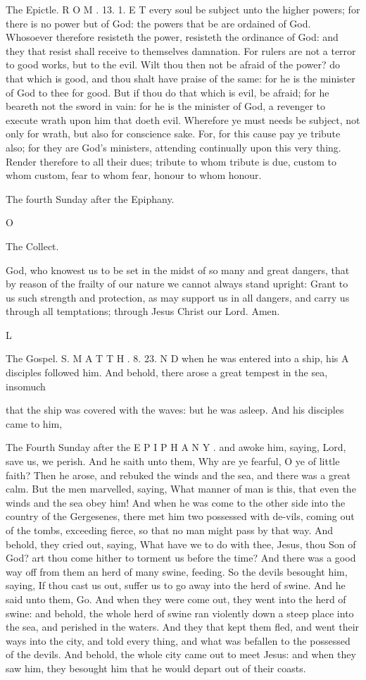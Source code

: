 The Epictle. R O M . 13. 1. E T every soul be subject unto the higher powers; for there is no power but of God: the powers that be are ordained of God. Whosoever therefore resisteth the power, resisteth the ordinance of God: and they that resist shall receive to themselves damnation. For rulers are not a terror to good works, but to the evil. Wilt thou then not be afraid of the power? do that which is good, and thou shalt have praise of the same: for he is the minister of God to thee for good. But if thou do that which is evil, be afraid; for he beareth not the sword in vain: for he is the minister of God, a revenger to execute wrath upon him that doeth evil. Wherefore ye must needs be subject, not only for wrath, but also for conscience sake. For, for this cause pay ye tribute also; for they are God's ministers, attending continually upon this very thing. Render therefore to all their dues; tribute to whom tribute is due, custom to whom custom, fear to whom fear, honour to whom honour.

The fourth Sunday after the Epiphany.

O

The Collect.

God, who knowest us to be set in the midst of so many and great dangers, that by reason of the frailty of our nature we cannot always stand upright: Grant to us such strength and protection, as may support us in all dangers, and carry us through all temptations; through Jesus Christ our Lord. Amen.

L

The Gospel. S. M A T T H . 8. 23. N D when he was entered into a ship, his A disciples followed him. And behold, there arose a great tempest in the sea, insomuch

that the ship was covered with the waves: but he was asleep. And his disciples came to him,

The Fourth Sunday after the E P I P H A N Y . and awoke him, saying, Lord, save us, we perish. And he saith unto them, Why are ye fearful, O ye of little faith? Then he arose, and rebuked the winds and the sea, and there was a great calm. But the men marvelled, saying, What manner of man is this, that even the winds and the sea obey him! And when he was come to the other side into the country of the Gergesenes, there met him two possessed with de-vils, coming out of the tombs, exceeding fierce, so that no man might pass by that way. And behold, they cried out, saying, What have we to do with thee, Jesus, thou Son of God? art thou come hither to torment us before the time? And there was a good way off from them an herd of many swine, feeding. So the devils besought him, saying, If thou cast us out, suffer us to go away into the herd of swine. And he said unto them, Go. And when they were come out, they went into the herd of swine: and behold, the whole herd of swine ran violently down a steep place into the sea, and perished in the waters. And they that kept them fled, and went their ways into the city, and told every thing, and what was befallen to the possessed of the devils. And behold, the whole city came out to meet Jesus: and when they saw him, they besought him that he would depart out of their coasts.

